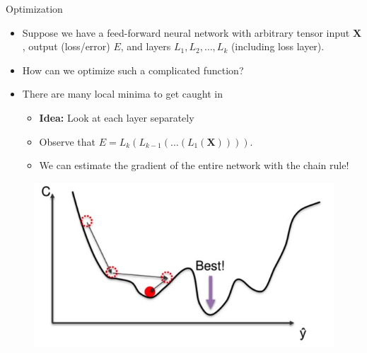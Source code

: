 \documentclass{beamer}
\begin{document}
\begin{frame}{Optimization}

    \begin{itemize}
        \item<1-> Suppose we have a feed-forward neural network with arbitrary tensor input $\bm{X}$, output (loss/error) $E$, and layers $L_1, L_2, \hdots, L_k$ (including loss layer).
        \item<1-> How can we optimize such a complicated function?
        \item<1-> There are many local minima to get caught in
        \begin{itemize}
            \item<2-> {\bf Idea:} Look at each layer separately
            \item<2-> Observe that $E = L_k(L_{k-1} (\hdots (L_1(\bm{X}))))$.
            \item<2-> We can estimate the gradient of the entire network with the chain rule!
        \end{itemize}
    \end{itemize}

    \begin{figure}
        \includegraphics[width=.5\textwidth]{minimum}
    \end{figure}
\end{frame}
\end{document}
